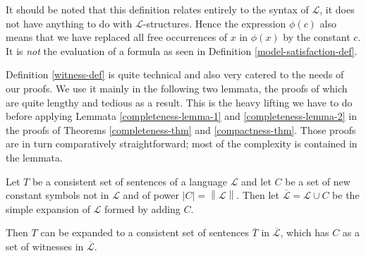 \documentclass[../../main.tex]{subfiles}
\begin{document}
It should be noted that this definition relates entirely to the syntax of $\mathcal{L}$, it does not have anything to do with $\mathcal{L}$-structures.
Hence the expression $\phi(c)$ also means that we have replaced all free occurrences of $x$ in $\phi(x)$ by the constant $c$.
It is \emph{not} the evaluation of a formula as seen in Definition \ref{model-satisfaction-def}.

Definition \ref{witness-def} is quite technical and also very catered to the needs of our proofs.
We use it mainly in the following two lemmata, the proofs of which are quite lengthy and tedious as a result.
This is the heavy lifting we have to do before applying Lemmata \ref{completeness-lemma-1} and \ref{completeness-lemma-2} in the proofs of Theorems \ref{completeness-thm} and \ref{compactness-thm}.
Those proofs are in turn comparatively straightforward; most of the complexity is contained in the lemmata.

\begin{lemma}\label{completeness-lemma-1}\cite[Lemma 2.1.1]{Cha90}
    Let $T$ be a consistent set of sentences of a language $\mathcal{L}$ and   
    let $C$ be a set of new constant symbols not in $\mathcal{L}$ and of power $\left\lvert C \right\rvert = \left\lVert \mathcal{L} \right\rVert$.
    Then let $\overline{\mathcal{L}} = \mathcal{L} \cup C$ be the simple expansion of $\mathcal{L}$ formed by adding $C$.
    
    Then $T$ can be expanded to a consistent set of sentences $\overline{T}$ in $\overline{\mathcal{L}}$, which has $C$ as a set of witnesses in $\overline{\mathcal{L}}$.
\end{lemma}
\end{document}
